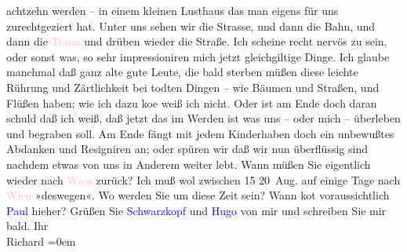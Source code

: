                achtzehn werden – in einem kleinen Lusthaus das man eigens für uns zurechtgezi{\geminationm}ert hat. Unter uns sehen wir die Strasse, und dann die
               Bahn, und dann die \textcolor{pink}{Traun}{}\ledrightnote{\textcolor{pink}{Traun}} und drüben wieder die
               Straße.\pend
           \pstart
           Ich scheine recht nervös {\pb}zu sein,
               oder sonst was, so sehr impressioniren mich jetzt gleichgiltige Dinge. Ich glaube
               manchmal daß ganz alte gute Leute, die bald sterben müßen diese leichte Rührung und
               Zärtlichkeit bei todten Dingen – wie Bäumen und {\pb}Straßen, und Flüßen haben; wie ich
               dazu ko{\geminationm}e weiß ich nicht. Oder ist am Ende doch daran
               schuld daß ich weiß, daß jetzt das im Werden ist was uns – oder mich – überleben und
               begraben soll. {\pb}Am Ende fängt mit
               jedem Kinderhaben doch ein unbewußtes Abdanken und Resigniren an; oder spüren wir daß
               wir nun überflüssig sind nachdem etwas von uns in {\pb}Anderem weiter lebt.\pend
           \pstart
           Wann müßen Sie eigentlich wieder nach \textcolor{pink}{Wien}{}\ledrightnote{\textcolor{pink}{Wien}} zurück?
               Ich muß wol zwischen 15{ }{\kaufmannsund}{ }20 Aug. auf einige Tage nach \textcolor{pink}{Wien}{}\ledrightnote{\textcolor{pink}{Wien}} »deswegen«. Wo werden Sie um diese Zeit sein? Wann ko{\geminationm}t voraussichtlich \textcolor{blue}{Paul}{}\ledrightnote{\textcolor{blue}{Paul Goldmann}} hieher? Grüßen {\pb}Sie \textcolor{blue}{Schwarzkopf}{}\ledrightnote{\textcolor{blue}{Gustav Schwarzkopf}} und \textcolor{blue}{Hugo}{}\ledrightnote{\textcolor{blue}{Hugo von Hofmannsthal}} von mir und
               schreiben Sie mir bald.\pend
           \pstart
           Ihr{\\[\baselineskip]}\spacefill\mbox{Richard}\pend
           \leftskip=0em{}\endnumbering{}  
      